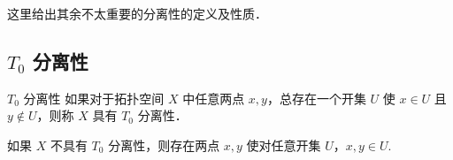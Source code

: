 
\begin{issues}
\issueDraft
\end{issues}

这里给出其余不太重要的分离性的定义及性质．

\subsection{$T_0$ 分离性}
\begin{definition}{$T_0$ 分离性}
如果对于拓扑空间 $X$ 中任意两点 $x,y$，总存在一个开集 $U$ 使 $x\in U$ 且 $y\notin U$，则称 $X$ 具有 $T_0$ 分离性．
\end{definition}

如果 $X$ 不具有 $T_0$ 分离性，则存在两点 $x,y$ 使对任意开集 $U$，$x,y\in U$.




